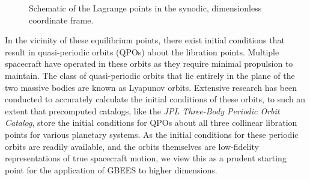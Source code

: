 \documentclass[paper,11pt]{AAS}
\begin{document}
\begin{figure}[htb]
\caption{Schematic of the Lagrange points in the synodic, dimensionless coordinate frame.}
	\label{fig:Libration_points}
\end{figure}

In the vicinity of these equilibrium points, there exist initial conditions that result in quasi-periodic orbits (QPOs) about the libration points. Multiple spacecraft have operated in these orbits \cite{ISEE-3, SOHO} as they require minimal propulsion to maintain. The class of quasi-periodic orbits that lie entirely in the plane of the two massive bodies are known as Lyapunov orbits\cite{vS67}. Extensive research has been conducted to accurately calculate the initial conditions of these orbits\cite{rF73}, to such an extent that precomputed catalogs, like the {\it JPL Three-Body Periodic Orbit Catalog}\cite{JPL3BO}, store the initial conditions for QPOs about all three collinear libration points for various planetary systems. As the initial conditions for these periodic orbits are readily available, and the orbits themselves are low-fidelity representations of true spacecraft motion, we view this as a prudent starting point for the application of GBEES to higher dimensions.
\end{document}
